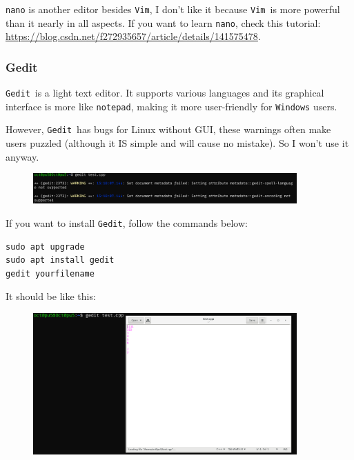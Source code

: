 \documentclass[12pt]{ctexart}
\begin{document}
\texttt{nano} is another editor besides \texttt{Vim}, I
don't like it because \texttt{Vim}\ is more powerful than
it nearly in all aspects. If you want to learn \texttt{nano}, check this
tutorial:
\url{https://blog.csdn.net/f272935657/article/details/141575478}.

\subsubsection*{\textbf{Gedit}}

\texttt{Gedit}\ is a light text editor. It supports various languages and
its graphical interface is more like \texttt{notepad}, making it more
user-friendly for \texttt{Windows} users.

However, \texttt{Gedit}\ has bugs for Linux without GUI, these warnings
often make users puzzled (although it IS simple and will cause no
mistake). So I won't use it anyway.

\begin{figure}[H]
    \centering
    \includegraphics[width=0.9\textwidth,keepaspectratio]{assets/Linux/1.3 How to edit files on Linux/6.png}
\end{figure}

If you want to install \texttt{Gedit}, follow the commands below:

\begin{adjustwidth}{2em}{0pt}
\begin{verbatim}
sudo apt upgrade
sudo apt install gedit
gedit yourfilename
\end{verbatim}
\end{adjustwidth}

It should be like this:

\begin{figure}[H]
    \centering
    \includegraphics[width=0.9\textwidth,keepaspectratio]{assets/Linux/1.3 How to edit files on Linux/7.png}
\end{figure}
\end{document}
